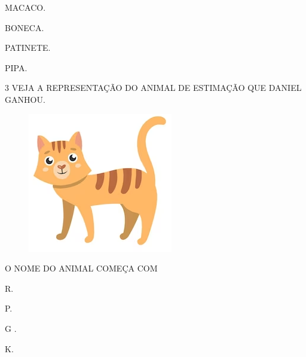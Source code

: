 \begin{escolha}[itemsep=-5pt]
\item MACACO.

\item BONECA.

\item PATINETE.

\item PIPA.
\end{escolha}

\num{3} VEJA A REPRESENTAÇÃO DO ANIMAL DE ESTIMAÇÃO QUE DANIEL GANHOU.

\begin{minipage}{.4\textwidth}
\begin{figure}[H]
\includegraphics[width=\textwidth]{media/image187.png}
\end{figure}
\end{minipage}
\begin{minipage}{.5\textwidth}
O NOME DO ANIMAL COMEÇA COM 

\begin{escolha}
\item R.

\item P.

\item G .

\item K.
\end{escolha}
\end{minipage}

